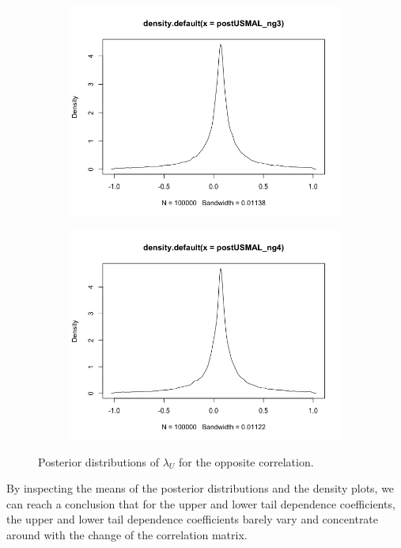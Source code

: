 \documentclass[mstat,12pt]{unswthesis}  %
\numberwithin{equation}{section}
\begin{document}
\begin{figure}[h]
\begin{subfigure}{.32\textwidth}
  \centering
  \includegraphics[width=\linewidth]{postUSMALng3.png}  
  \label{fig:sub-third}
\end{subfigure}
\begin{subfigure}{.32\textwidth}
  \centering
  \includegraphics[width=\linewidth]{postUSMALng4.png}  
  \label{fig:sub-fourth}
\end{subfigure}
\caption{Posterior distributions of $\lambda_U$ for the opposite correlation.}
\label{fig:fig}
\end{figure}
By inspecting the means of the posterior distributions and the density plots, we can reach a conclusion that for the upper and lower tail dependence coefficients, the upper and lower tail dependence coefficients barely vary and concentrate around with the change of the correlation matrix.
\newpage
\end{document}
